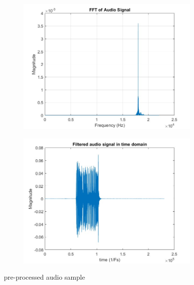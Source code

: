 \begin{figure}[H]
    \centering
    \begin{subfigure}{0.48\textwidth}
    \includegraphics[width=\textwidth]{LiveAudioWatermarking/images/FFT_filtered.jpg}
    \caption{}
    \label{}
    \end{subfigure}%
    \hfill
     \begin{subfigure}{0.48\textwidth}
    \includegraphics[width=\textwidth]{LiveAudioWatermarking/images/sign_td_filt.jpg}
    \caption{}
    \label{}
    \end{subfigure}
    \caption{pre-processed audio sample}
    \label{fig:filtered_signal}
\end{figure}

